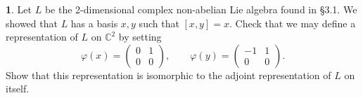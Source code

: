 \documentclass[12pt]{article}
\theoremstyle{definition}
\newtheorem{ex}{}
\begin{document}
\begin{ex}
	Let $L$ be the 2-dimensional complex non-abelian Lie algebra found in \S3.1.
	We showed that $L$ has a basis $x, y$ such that $[x, y] = x$.
	Check that we may define a representation of $L$ on $\mathbb{C}^2$ by setting \begin{equation*}
		\varphi(x) = \begin{pmatrix} 0 & 1 \\ 0 & 0 \end{pmatrix}, \hspace{2em} \varphi(y) = \begin{pmatrix} -1 & 1 \\ 0 & 0 \end{pmatrix}.
	\end{equation*}
	Show that this representation is isomorphic to the adjoint representation of $L$ on itself.
\end{ex}
\end{document}
